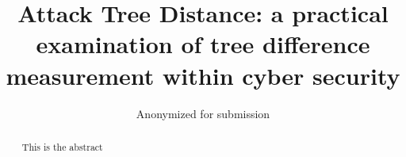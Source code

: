 \documentclass[format=sigconf]{acmart}
\begin{document}
\title{Attack Tree Distance: a practical examination of tree difference measurement within cyber security}

\iffalse{
    \author{Nathan D. Schiele}
    \orcid{0000-0003-1186-1503}
    \affiliation{\institution{Leiden University}
        \city{Leiden}
        \country{The Netherlands}}
    \email{n.d.schiele@liacs.leidenuniv.nl}


    \author{Olga Gadyatskaya}
    \orcid{0000-0002-3760-9165}
    \affiliation{\institution{Leiden University}
        \city{Leiden}
        \country{The Netherlands}}
    \email{o.gadyatskaya@liacs.leidenuniv.nl}
}\fi
\author{Anonymized for submission}









\begin{abstract}

    This is the abstract
\end{abstract}

\maketitle              %












% 
% 
% 
% 




\cite{*}



{}




\appendix
% 

% 
\end{document}
